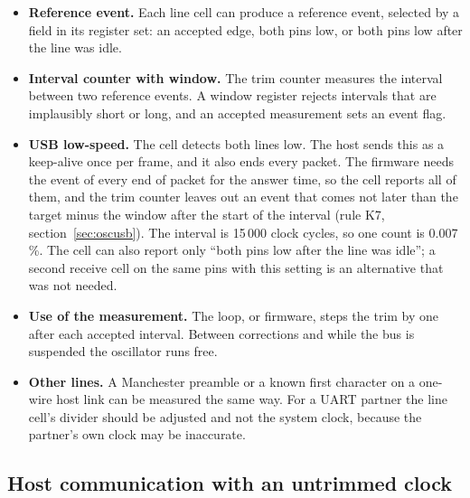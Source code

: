 \documentclass[10pt,a4paper]{article}
\begin{document}
\begin{itemize}
\item \textbf{Reference event.} Each line cell can produce a reference event, selected by a field in its
register set: an accepted edge, both pins low, or both pins low after the line was idle.
\item \textbf{Interval counter with window.} The trim counter measures the interval between two reference
events. A window register rejects intervals that are implausibly short or long, and an accepted measurement
sets an event flag.
\item \textbf{USB low-speed.} The cell detects both lines low. The host sends this as a keep-alive once per frame,
and it also ends every packet. The firmware needs the event of every end of packet for the answer time, so
the cell reports all of them, and the trim counter leaves out an event that comes not later than the target minus the window after the start of the interval (rule K7, section~\ref{sec:oscusb}). The interval is 15\,000 clock cycles, so one count is 0.007\,\%. The
cell can also report only ``both pins low after the line was idle''; a second receive cell on the same pins
with this setting is an alternative that was not needed.
\item \textbf{Use of the measurement.} The loop, or firmware, steps the trim by one after each accepted
interval. Between corrections and while the bus is suspended the oscillator runs free.
\item \textbf{Other lines.} A Manchester preamble or a known first character on a one-wire host link can be
measured the same way. For a UART partner the line cell's divider should be adjusted and not the system clock,
because the partner's own clock may be inaccurate.
\end{itemize}

\subsection{Host communication with an untrimmed clock}
\end{document}
